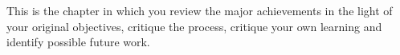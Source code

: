 This is the chapter in which you review the major achievements in the
light of your original objectives, critique the process, critique your
own learning and identify possible future work.